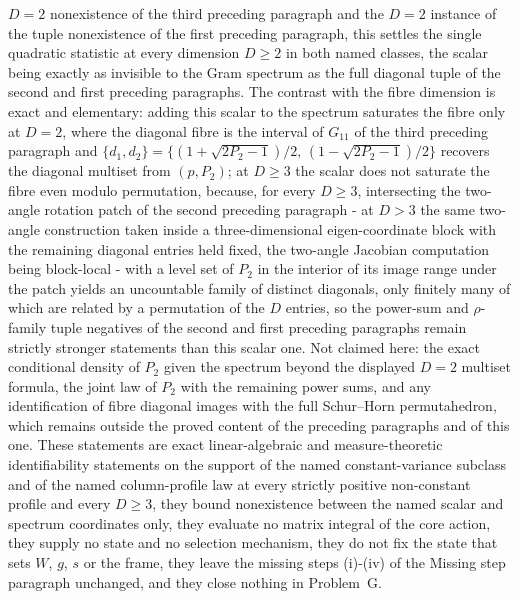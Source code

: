 \(D=2\) nonexistence of the third preceding paragraph and the \(D=2\) instance of the tuple nonexistence of the first preceding paragraph, this settles the single quadratic statistic at every dimension \(D\ge2\) in both named classes, the scalar being exactly as invisible to the Gram spectrum as the full diagonal tuple of the second and first preceding paragraphs. The contrast with the fibre dimension is exact and elementary: adding this scalar to the spectrum saturates the fibre only at \(D=2\), where the diagonal fibre is the interval of \(G_{11}\) of the third preceding paragraph and \(\{d_{1},d_{2}\}=\{(1+\sqrt{2P_{2}-1})/2,\,(1-\sqrt{2P_{2}-1})/2\}\) recovers the diagonal multiset from \((p,P_{2})\); at \(D\ge3\) the scalar does not saturate the fibre even modulo permutation, because, for every \(D\ge3\), intersecting the two-angle rotation patch of the second preceding paragraph - at \(D>3\) the same two-angle construction taken inside a three-dimensional eigen-coordinate block with the remaining diagonal entries held fixed, the two-angle Jacobian computation being block-local - with a level set of \(P_{2}\) in the interior of its image range under the patch yields an uncountable family of distinct diagonals, only finitely many of which are related by a permutation of the \(D\) entries, so the power-sum and \(\rho\)-family tuple negatives of the second and first preceding paragraphs remain strictly stronger statements than this scalar one. Not claimed here: the exact conditional density of \(P_{2}\) given the spectrum beyond the displayed \(D=2\) multiset formula, the joint law of \(P_{2}\) with the remaining power sums, and any identification of fibre diagonal images with the full Schur--Horn permutahedron, which remains outside the proved content of the preceding paragraphs and of this one. These statements are exact linear-algebraic and measure-theoretic identifiability statements on the support of the named constant-variance subclass and of the named column-profile law at every strictly positive non-constant profile and every \(D\ge3\), they bound nonexistence between the named scalar and spectrum coordinates only, they evaluate no matrix integral of the core action, they supply no state and no selection mechanism, they do not fix the state that sets \(W\), \(g\), \(s\) or the frame, they leave the missing steps (i)-(iv) of the Missing step paragraph unchanged, and they close nothing in Problem~G.

